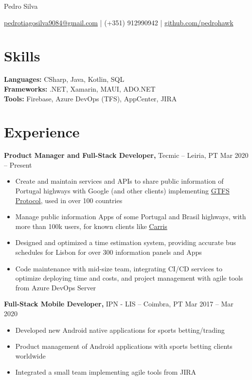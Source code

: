 \documentclass[11pt]{article}       %
\begin{document}
\centerline{\Huge Pedro Silva}

\vspace{5pt}

\centerline{\href{mailto:pedrotiagosilva9084@gmail.com}{pedrotiagosilva9084@gmail.com} | (+351) 912990942 | \href{https://github.com/pedrohawk}{github.com/pedrohawk}}

\vspace{-10pt}

\section*{Skills}
\textbf{Languages:} CSharp, Java, Kotlin, SQL \\
\textbf{Frameworks:} .NET, Xamarin, MAUI, ADO.NET \\
\textbf{Tools:} Firebase, Azure DevOps (TFS), AppCenter, JIRA \\

\vspace{-6.5pt}

\section*{Experience}
\textbf{Product Manager and Full-Stack Developer,} {Tecmic} -- Leiria, PT \hfill Mar 2020 -- Present \\
\vspace{-9pt}
\begin{itemize}
  \item Create and maintain services and APIs to share public information of Portugal highways with Google (and other clients) implementing \href{https://gtfs.org/getting-started/what-is-GTFS/}{GTFS Protocol}, used in over 100 countries
  \item Manage public information Apps of some Portugal and Brasil highways, with more than 100k users, for known clients like \href{https://play.google.com/store/search?q=carris&c=apps}{Carris}
  \item Designed and optimized a time estimation system, providing accurate bus schedules for Lisbon for over 300 information panels and Apps
  \item Code maintenance with mid-size team, integrating CI/CD services to optimize deploying time and costs, and project management with agile tools from Azure DevOps Server
\end{itemize}

\textbf{Full-Stack Mobile Developer,} {IPN - LIS} -- Coimbra, PT \hfill Mar 2017 -- Mar 2020 \\
\vspace{-9pt}
\begin{itemize}
  \item Developed new Android native applications for sports betting/trading
  \item Product management of Android applications with sports betting clients worldwide
  \item Integrated a small team implementing agile tools from JIRA
\end{itemize}
\end{document}
